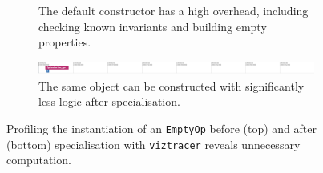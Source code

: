 \begin{figure}[H]
    \centering
    \begin{subfigure}[b]{\textwidth}
        \centering
        \captionsetup{width=0.8\textwidth}
        \caption{The default constructor has a high overhead, including checking known invariants and building empty properties.}
        \label{fig:ubenchmark-original-instantiation-xdsl-viztracer}
    \end{subfigure}
    \begin{subfigure}[b]{\textwidth}
        \centering
        \includegraphics[width=\textwidth]{images/specialising_optimising_xdsl_rewriting/optimised_empty_create_scale.png}
        \captionsetup{width=0.8\textwidth}
        \caption{The same object can be constructed with significantly less logic after specialisation.}
        \label{fig:ubenchmark-optimised-instantiation-xdsl-viztracer}
    \end{subfigure}
    \caption{Profiling the instantiation of an \texttt{EmptyOp} before (top) and after (bottom) specialisation with \texttt{viztracer} reveals unnecessary computation.}
    \label{fig:ubenchmark-instantiation-xdsl-viztracer}
\end{figure}

